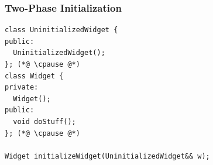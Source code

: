 \documentclass[aspectratio=169]{beamer}
\newif\iftransitions
\newcommand{\cpause}{\iftransitions \pause \fi}
\begin{document}
\begin{frame}[fragile]
  \frametitle{Two-Phase Initialization}

  \begin{lstlisting}[style=cpp20]
class UninitializedWidget {
public:
  UninitializedWidget();
}; (*@ \cpause @*)
class Widget {
private:
  Widget();
public:
  void doStuff();
}; (*@ \cpause @*)

Widget initializeWidget(UninitializedWidget&& w);
  \end{lstlisting}
  
\end{frame}

\end{document}
